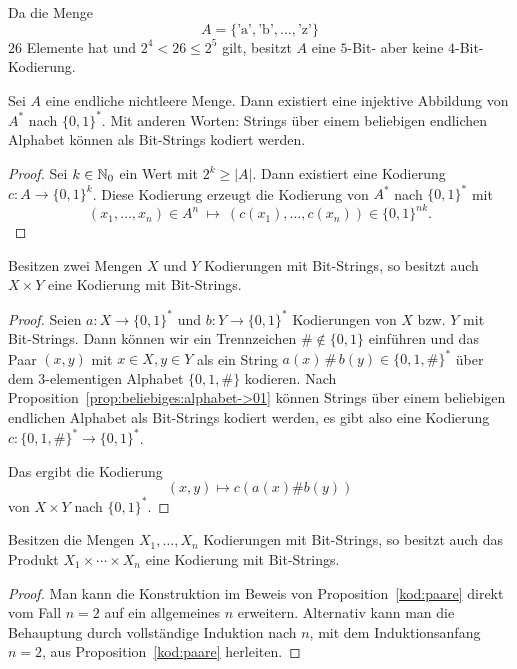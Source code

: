 \begin{bsp}
	Da die Menge 
	\[
		A = \{\text{'a'},\text{'b'},\ldots,\text{'z'}\}
	\]
	$26$ Elemente hat und $2^4 < 26 \le 2^5$ gilt, besitzt $A$ eine $5$-Bit- aber keine $4$-Bit-Kodierung. 
\end{bsp} 

\begin{prop} \label{prop:beliebiges:alphabet->01}
	Sei $A$ eine endliche nichtleere Menge. Dann existiert eine injektive Abbildung von $A^\ast$ nach $\{0,1\}^\ast$. Mit anderen Worten: Strings über einem beliebigen endlichen Alphabet können als Bit-Strings kodiert werden. 
\end{prop} 
\begin{proof} 
	Sei $k \in \mathbb{N}_0$ ein Wert mit $2^k \ge |A|$. Dann existiert eine Kodierung $ c : A \to \{0,1\}^k$. Diese Kodierung erzeugt die Kodierung  von $A^\ast$ nach $\{0,1\}^\ast$ mit
	\[
		(x_1, \ldots ,x_n) \in A^n \ \mapsto \ (c(x_1),\ldots,c(x_n)) \in \{0,1\}^{nk}.
	\]
\end{proof} 


\begin{prop} \label{kod:paare}
	Besitzen zwei Mengen $X$ und $Y$ Kodierungen mit Bit-Strings, so besitzt auch $X \times Y$ eine Kodierung mit Bit-Strings. 
\end{prop} 
\begin{proof}
	Seien $ a : X \to \{0,1\}^\ast$ und $b : Y \to \{0,1\}^\ast$ Kodierungen von $X$ bzw. $Y$ mit Bit-Strings. Dann können wir ein Trennzeichen $\# \not\in \{0,1\}$ einführen und das Paar $(x,y)$ mit $x \in X, y \in Y$ als ein String $a(x) \, \# \,  b(y) \in \{0,1,\#\}^\ast$ über dem $3$-elementigen Alphabet $\{0,1,\#\}$ kodieren. Nach Proposition~\ref{prop:beliebiges:alphabet->01} können Strings über einem beliebigen endlichen Alphabet als Bit-Strings kodiert werden, es gibt also eine Kodierung $c : \{0,1,\#\}^\ast \to \{0,1\}^\ast$.

	 Das ergibt die Kodierung 
	 \[
	 		(x,y) \mapsto c ( a(x) \# b(y))
	 \] 
	 von $X \times Y$ nach $\{0,1\}^\ast$. 
\end{proof} 

\begin{kor} \label{kod:tupel}
	Besitzen die Mengen $X_1,\ldots,X_n$ Kodierungen mit Bit-Strings, so besitzt auch das Produkt $X_1 \times \cdots \times X_n$ eine Kodierung mit Bit-Strings. 
\end{kor} 
\begin{proof} 
Man kann die Konstruktion im Beweis von Proposition~\ref{kod:paare} direkt vom Fall $n=2$ auf ein allgemeines $n$ erweitern. Alternativ kann man die Behauptung durch vollständige Induktion nach $n$, mit dem Induktionsanfang $n=2$, aus Proposition~\ref{kod:paare} herleiten. 
\end{proof} 


